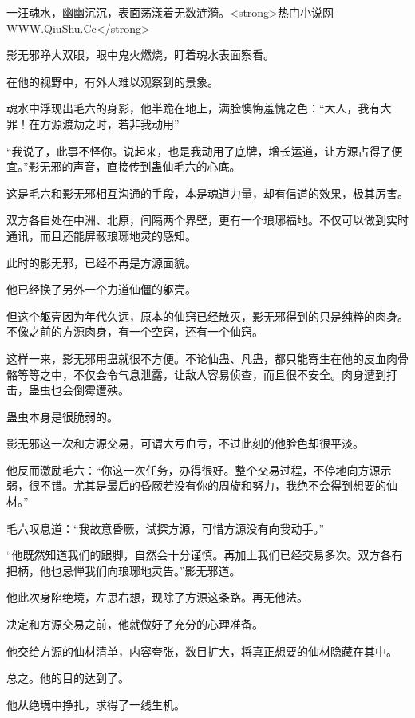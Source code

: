 
\begin{this_body}

一汪魂水，幽幽沉沉，表面荡漾着无数涟漪。<strong>热门小说网WWW.QiuShu.Cc</strong>

影无邪睁大双眼，眼中鬼火燃烧，盯着魂水表面察看。

在他的视野中，有外人难以观察到的景象。

魂水中浮现出毛六的身影，他半跪在地上，满脸懊悔羞愧之色：“大人，我有大罪！在方源渡劫之时，若非我动用”

“我说了，此事不怪你。说起来，也是我动用了底牌，增长运道，让方源占得了便宜。”影无邪的声音，直接传到蛊仙毛六的心底。

这是毛六和影无邪相互沟通的手段，本是魂道力量，却有信道的效果，极其厉害。

双方各自处在中洲、北原，间隔两个界壁，更有一个琅琊福地。不仅可以做到实时通讯，而且还能屏蔽琅琊地灵的感知。

此时的影无邪，已经不再是方源面貌。

他已经换了另外一个力道仙僵的躯壳。

但这个躯壳因为年代久远，原本的仙窍已经散灭，影无邪得到的只是纯粹的肉身。不像之前的方源肉身，有一个空窍，还有一个仙窍。

这样一来，影无邪用蛊就很不方便。不论仙蛊、凡蛊，都只能寄生在他的皮血肉骨骼等等之中，不仅会令气息泄露，让敌人容易侦查，而且很不安全。肉身遭到打击，蛊虫也会倒霉遭殃。

蛊虫本身是很脆弱的。

影无邪这一次和方源交易，可谓大亏血亏，不过此刻的他脸色却很平淡。

他反而激励毛六：“你这一次任务，办得很好。整个交易过程，不停地向方源示弱，很不错。尤其是最后的昏厥若没有你的周旋和努力，我绝不会得到想要的仙材。”

毛六叹息道：“我故意昏厥，试探方源，可惜方源没有向我动手。”

“他既然知道我们的跟脚，自然会十分谨慎。再加上我们已经交易多次。双方各有把柄，他也忌惮我们向琅琊地灵告。”影无邪道。

他此次身陷绝境，左思右想，现除了方源这条路。再无他法。

决定和方源交易之前，他就做好了充分的心理准备。

他交给方源的仙材清单，内容夸张，数目扩大，将真正想要的仙材隐藏在其中。

总之。他的目的达到了。

他从绝境中挣扎，求得了一线生机。


\end{this_body}
